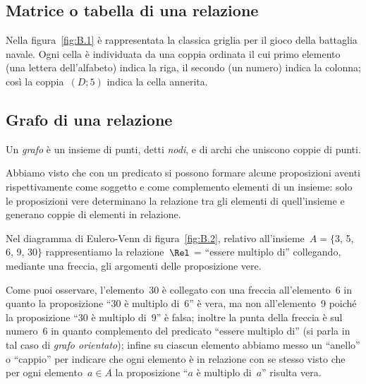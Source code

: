 \ovalbox{\risolvii \ref{ese:B.7}, \ref{ese:B.8}}

\subsection{Matrice o tabella di una relazione}

Nella figura~\ref{fig:B.1} è rappresentata la classica griglia per il gioco della battaglia navale.
Ogni cella è individuata da una coppia ordinata il cui primo elemento (una lettera dell'alfabeto) indica la riga,
il secondo (un numero) indica la colonna; così la coppia~$(D;5)$ indica la cella annerita.

\ovalbox{\risolvii \ref{ese:B.9}, \ref{ese:B.10}, \ref{ese:B.11}}

\subsection{Grafo di una relazione}

\begin{definizione}
Un \emph{grafo} è un insieme di punti, detti \emph{nodi}, e di archi che uniscono coppie di punti.
\end{definizione}

Abbiamo visto che con un predicato si possono formare alcune proposizioni aventi rispettivamente come soggetto e
come complemento elementi di un insieme: solo le proposizioni vere determinano la relazione tra gli elementi di
quell'insieme e generano coppie di elementi in relazione.

\begin{exrig}
 \begin{esempio}

Nel diagramma di Eulero-Venn di figura~\ref{fig:B.2}, relativo all'insieme~$A = \{$3, 5, 6, 9, 30$\}$
rappresentiamo la relazione~$\Rel$ = ``essere multiplo di'' collegando, mediante una freccia, gli argomenti delle proposizione vere.

Come puoi osservare, l'elemento~30 è collegato con una freccia all'elemento~6 in quanto la proposizione ``30 è multiplo di~6'' è vera, ma non all'elemento~9
poiché la proposizione ``30 è multiplo di~9'' è falsa; inoltre la punta della freccia è sul numero~6 in quanto complemento del predicato ``essere multiplo di'' (si parla in tal caso di \emph{grafo orientato});
infine su ciascun elemento abbiamo messo un ``anello'' o ``cappio'' per indicare che ogni elemento è in relazione con se stesso visto che per ogni
elemento~$a \in A$ la proposizione ``$a$ è multiplo di~$a$'' risulta vera.

 \end{esempio}
\end{exrig}


